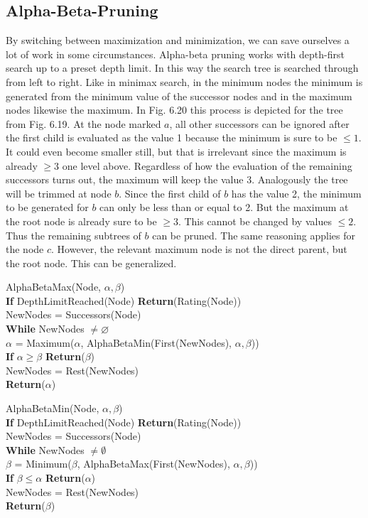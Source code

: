 \documentclass[10pt]{book}
\begin{document}
\subsection{Alpha-Beta-Pruning}
By switching between maximization and minimization, we can save ourselves a lot of work in some circumstances. Alpha-beta pruning works with depth-first search up to a preset depth limit. In this way the search tree is searched through from left to right. Like in minimax search, in the minimum nodes the minimum is generated from the minimum value of the successor nodes and in the maximum nodes likewise the maximum. In Fig. 6.20 this process is depicted for the tree from Fig. 6.19. At the node marked $a$, all other successors can be ignored after the first child is evaluated as the value 1 because the minimum is sure to be $\leq 1$. It could even become smaller still, but that is irrelevant since the maximum is already $\geq 3$ one level above. Regardless of how the evaluation of the remaining successors turns out, the maximum will keep the value 3. Analogously the tree will be trimmed at node $b$. Since the first child of $b$ has the value 2, the minimum to be generated for $b$ can only be less than or equal to 2. But the maximum at the root node is already sure to be $\geq 3$. This cannot be changed by values $\leq 2$. Thus the remaining subtrees of $b$ can be pruned.
The same reasoning applies for the node $c$. However, the relevant maximum node is not the direct parent, but the root node. This can be generalized.

AlphaBetaMax(Node, $\alpha, \beta$)\\
\textbf{If} DepthLimitReached(Node) \textbf{Return}(Rating(Node))\\
NewNodes = Successors(Node)\\
\textbf{While} NewNodes $\neq \varnothing$\\
\quad $\alpha$ = Maximum($\alpha$, AlphaBetaMin(First(NewNodes), $\alpha, \beta$))\\
\textbf{If} $\alpha \geq \beta$ \textbf{Return}($\beta$)\\
NewNodes = Rest(NewNodes)\\
\textbf{Return}($\alpha$)

AlphaBetaMin(Node, $\alpha, \beta$)\\
\textbf{If} DepthLimitReached(Node) \textbf{Return}(Rating(Node))\\
NewNodes = Successors(Node)\\
\textbf{While} NewNodes $\neq \emptyset$\\
\quad $\beta$ = Minimum($\beta$, AlphaBetaMax(First(NewNodes), $\alpha, \beta$))\\
\textbf{If} $\beta \leq \alpha$ \textbf{Return}($\alpha$)\\
NewNodes = Rest(NewNodes)\\
\textbf{Return}($\beta$)
\end{document}
